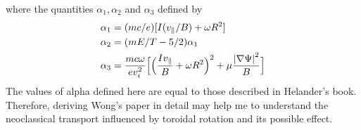 where the quantities $\alpha_1, \alpha_2$ and $\alpha_3$ defined by 
\begin{align}
    \alpha_1 &= (mc/e)[I(v_\parallel /B) + \omega R^2] \\
    \alpha_2 &= (mE/T - 5/2)\alpha_1 \\
    \alpha_3 &= \frac{mc\omega}{ev_i^2}\Big[\Big(\frac{Iv_\parallel}{B}+\omega R^2\Big)^2 + \mu \frac{\abs{\nabla \Psi}^2}{B}\Big]
\end{align}
The values of alpha defined here are equal to those described in Helander's book. Therefore, deriving Wong's paper in detail may help me to understand the neoclassical transport influenced by toroidal rotation and its possible effect.